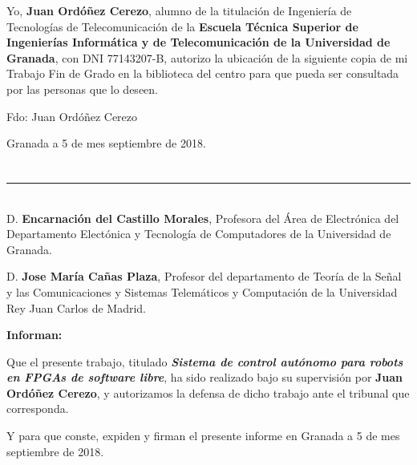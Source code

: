 Yo, \textbf{Juan Ordóñez Cerezo}, alumno de la titulación de Ingeniería de Tecnologías de Telecomunicación de la \textbf{Escuela Técnica Superior
de Ingenierías Informática y de Telecomunicación de la Universidad de Granada}, con DNI 77143207-B, autorizo la
ubicación de la siguiente copia de mi Trabajo Fin de Grado en la biblioteca del centro para que pueda ser
consultada por las personas que lo deseen.

\vspace{6cm}

\noindent Fdo: Juan Ordóñez Cerezo

\vspace{2cm}

\begin{flushright}
Granada a 5 de mes septiembre de 2018.
\end{flushright}


\chapter*{}
\thispagestyle{empty}

\noindent\rule[-1ex]{\textwidth}{2pt}\\[4.5ex]

D. \textbf{Encarnación del Castillo Morales}, Profesora del Área de Electrónica del Departamento Electónica y Tecnología de Computadores de la Universidad de Granada.

\vspace{0.5cm}

D. \textbf{Jose María Cañas Plaza}, Profesor del departamento de Teoría de la Señal y las Comunicaciones y Sistemas Telemáticos y Computación de la Universidad Rey Juan Carlos de Madrid.


\vspace{0.5cm}

\textbf{Informan:}

\vspace{0.5cm}

Que el presente trabajo, titulado \textit{\textbf{Sistema de control autónomo para robots en FPGAs de software libre}},
ha sido realizado bajo su supervisión por \textbf{Juan Ordóñez Cerezo}, y autorizamos la defensa de dicho trabajo ante el tribunal
que corresponda.

\vspace{0.5cm}

Y para que conste, expiden y firman el presente informe en Granada a 5 de mes septiembre de 2018.

